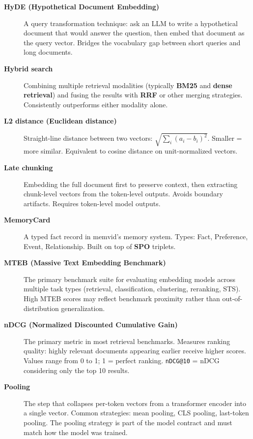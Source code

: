 \begin{description}
\item[\textbf{HyDE (Hypothetical Document Embedding)}]
A query transformation technique: ask an LLM to write a hypothetical document that would
answer the question, then embed that document as the query vector. Bridges the vocabulary gap
between short queries and long documents.

\item[\textbf{Hybrid search}]
Combining multiple retrieval modalities (typically \textbf{BM25} and \textbf{dense retrieval})
and fusing the results with \textbf{RRF} or other merging strategies. Consistently outperforms
either modality alone.

\item[\textbf{L2 distance (Euclidean distance)}]
Straight-line distance between two vectors: $\sqrt{\sum_i (a_i - b_i)^2}$. Smaller = more
similar. Equivalent to cosine distance on unit-normalized vectors.

\item[\textbf{Late chunking}]
Embedding the full document first to preserve context, then extracting chunk-level vectors
from the token-level outputs. Avoids boundary artifacts. Requires token-level model outputs.

\item[\textbf{MemoryCard}]
A typed fact record in memvid's memory system. Types: Fact, Preference, Event, Relationship.
Built on top of \textbf{SPO} triplets.

\item[\textbf{MTEB (Massive Text Embedding Benchmark)}]
The primary benchmark suite for evaluating embedding models across multiple task types
(retrieval, classification, clustering, reranking, STS). High MTEB scores may reflect
benchmark proximity rather than out-of-distribution generalization.

\item[\textbf{nDCG (Normalized Discounted Cumulative Gain)}]
The primary metric in most retrieval benchmarks. Measures ranking quality: highly relevant
documents appearing earlier receive higher scores. Values range from 0 to 1; 1 = perfect
ranking. \texttt{nDCG@10} = nDCG considering only the top 10 results.

\item[\textbf{Pooling}]
The step that collapses per-token vectors from a transformer encoder into a single vector.
Common strategies: mean pooling, CLS pooling, last-token pooling. The pooling strategy is
part of the model contract and must match how the model was trained.


\end{description}
